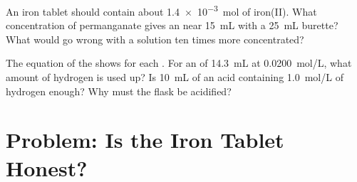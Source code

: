 \begin{exercise}[$\star\star\star$]\label{exo:g11:titration:14}
An iron tablet should contain about \qty{1.4e-3}{mol} of iron(II). What
concentration of permanganate gives an  near
\qty{15}{mL} with a \qty{25}{mL} burette? What would go wrong with a
solution ten times more concentrated?
\end{exercise}

\begin{exercise}[$\star\star\star$]\label{exo:g11:titration:15}
The equation of the  shows  for each . For an
 of \qty{14.3}{mL} at \qty{0.0200}{mol/L}, what amount of
hydrogen  is used up? Is \qty{10}{mL} of an acid containing
\qty{1.0}{mol/L} of hydrogen  enough? Why must the flask be
acidified?
\end{exercise}

\section{Problem: Is the Iron Tablet Honest?}

